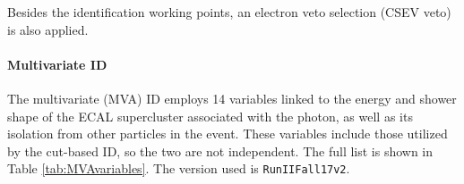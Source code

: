 Besides the identification working points, an electron veto selection (CSEV veto) is also applied.



\paragraph{Multivariate ID}
The multivariate (MVA) ID employs 14 variables linked to the energy and shower shape of the ECAL supercluster associated with the photon, as well as its isolation from other particles in the event.
These variables include those utilized by the cut-based ID, so the two are not independent.
The full list is shown in Table \ref{tab:MVAvariables}.
The version used is \texttt{RunIIFall17v2}.

